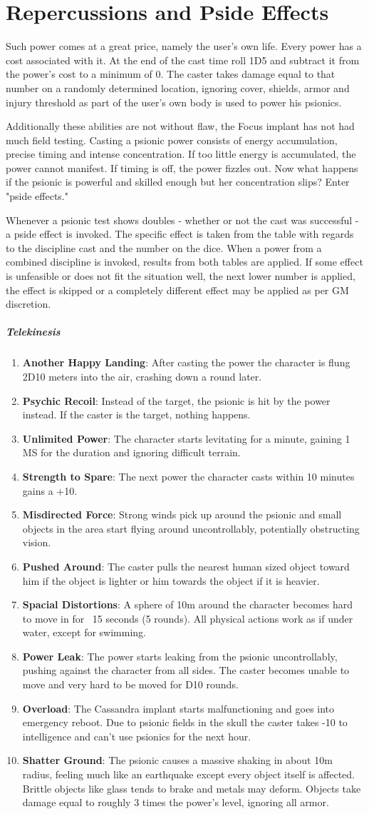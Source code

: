 \documentclass[12pt,a4paper,openany]{book}
\newcommand{\mod}[2]{\item \textbf{#1}: #2}
\newcommand{\dpeii}{\mod{Psychic Recoil}{Instead of the target, the psionic is hit by the power instead. If the caster is the target, nothing happens.}}
\newcommand{\dpeiv}{\mod{Strength to Spare}{The next power the character casts within 10 minutes gains a +10.}}
\newcommand{\dpeix}{\mod{Overload}{The Cassandra implant starts malfunctioning and goes into emergency reboot. Due to psionic fields in the skull the caster takes -10 to intelligence and can't use psionics for the next hour.}\setcounter{enumi}{-1}}
\begin{document}
	\chapter{Repercussions and Pside Effects}
	Such power comes at a great price, namely the user's own life. Every power has a cost associated with it. At the end of the cast time roll 1D5 and subtract it from the power's cost to a minimum of 0. The caster takes damage equal to that number on a randomly determined location, ignoring cover, shields, armor and injury threshold as part of the user's own body is used to power his psionics.
	
	\vspace*{5mm}
	Additionally these abilities are not without flaw, the Focus implant has not had much field testing. Casting a psionic power consists of energy accumulation, precise timing and intense concentration. If too little energy is accumulated, the power cannot manifest. If timing is off, the power fizzles out. Now what happens if the psionic is powerful and skilled enough but her concentration slips? Enter "pside effects."\par
	Whenever a psionic test shows doubles - whether or not the cast was successful - a pside effect is invoked. The specific effect is taken from the table with regards to the discipline cast and the number on the dice. When a power from a combined discipline is invoked, results from both tables are applied. If some effect is unfeasible or does not fit the situation well, the next lower number is applied, the effect is skipped or a completely different effect may be applied as per GM discretion.
	
	\paragraph{Telekinesis}
	\begin{enumerate}
		\mod{Another Happy Landing}{After casting the power the character is flung 2D10 meters into the air, crashing down a round later.}
		\dpeii
		\mod{Unlimited Power}{The character starts levitating for a minute, gaining 1 MS for the duration and ignoring difficult terrain.}
		\dpeiv
		\mod{Misdirected Force}{Strong winds pick up around the psionic and small objects in the area start flying around uncontrollably, potentially obstructing vision.}
		\mod{Pushed Around}{The caster pulls the nearest human sized object toward him if the object is lighter or him towards the object if it is heavier.}
		\mod{Spacial Distortions}{A sphere of 10m around the character becomes hard to move in for ~15 seconds (5 rounds). All physical actions work as if under water, except for swimming.}
		\mod{Power Leak}{The power starts leaking from the psionic uncontrollably, pushing against the character from all sides. The caster becomes unable to move and very hard to be moved for D10 rounds.}
		\dpeix
		\mod{Shatter Ground}{The psionic causes a massive shaking in about 10m radius, feeling much like an earthquake except every object itself is affected. Brittle objects like glass tends to brake and metals may deform. Objects take damage equal to roughly 3 times the power's level, ignoring all armor.}
	\end{enumerate}
\end{document}
